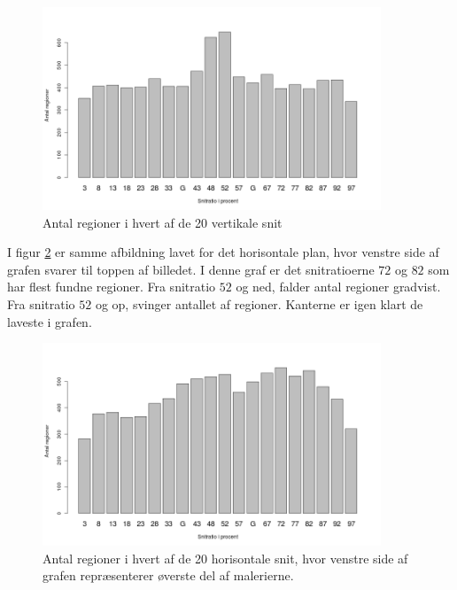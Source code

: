 {\begin{figure}[h!]
	\begin{center}
		\includegraphics[width=0.9\textwidth]{afsnit/resultater/billeder/cut0cut1eatsperratioU.png}
	\end{center}
	\caption{Antal regioner i hvert af de 20 vertikale snit}
	\label{antal_regioner_vertikale_cut_udvidet}
\end{figure}

I figur \ref{antal_regioner_horisontale_cut_udvidet} er samme afbildning
lavet for det horisontale plan, hvor venstre side af grafen svarer til
toppen af billedet. I denne graf er det snitratioerne $72$ og $82$ som
har flest fundne regioner. Fra snitratio $52$ og ned, falder antal
regioner gradvist. Fra snitratio $52$ og op, svinger antallet af
regioner. Kanterne er igen klart de laveste i grafen.

\begin{figure}[h!]
	\begin{center}
		\includegraphics[width=0.9\textwidth]{afsnit/resultater/billeder/cut2cut3eatsperratioU.png}
	\end{center}
    \caption{Antal regioner i hvert af de 20 horisontale snit, hvor
    venstre side af grafen repræsenterer øverste del af malerierne.}
    \label{antal_regioner_horisontale_cut_udvidet}
\end{figure}

}
